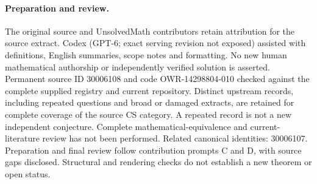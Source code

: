 \documentclass[11pt]{article}
\begin{document}
\paragraph{Preparation and review.}
The original source and UnsolvedMath contributors retain attribution for the source extract. Codex (GPT-6; exact serving revision not exposed) assisted with definitions, English summaries, scope notes and formatting. No new human mathematical authorship or independently verified solution is asserted. Permanent source ID 30006108 and code OWR-14298804-010 checked against the complete supplied registry and current repository. Distinct upstream records, including repeated questions and broad or damaged extracts, are retained for complete coverage of the source CS category. A repeated record is not a new independent conjecture. Complete mathematical-equivalence and current-literature review has not been performed. Related canonical identities: 30006107. Preparation and final review follow contribution prompts C and D, with source gaps disclosed. Structural and rendering checks do not establish a new theorem or open status.
\label{end:30006108}
\end{document}
